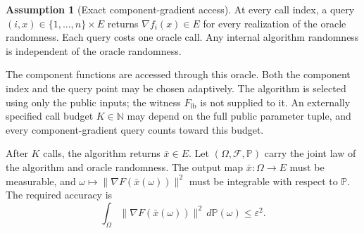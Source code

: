\documentclass[10pt]{article}
\theoremstyle{definition}
\newtheorem{assumption}{Assumption}
\begin{document}
\begin{assumption}[Exact component-gradient access]
At every call index, a query $(i,x)\in\{1,\ldots,n\}\times E$ returns $\nabla f_i(x)\in E$ for every realization of the oracle randomness. Each query costs one oracle call. Any internal algorithm randomness is independent of the oracle randomness.
\end{assumption}

The component functions are accessed through this oracle. Both the component index and the query point may be chosen adaptively. The algorithm is selected using only the public inputs; the witness $F_{\mathrm{lb}}$ is not supplied to it. An externally specified call budget $K\in\mathbb{N}$ may depend on the full public parameter tuple, and every component-gradient query counts toward this budget.

After $K$ calls, the algorithm returns $\bar{x}\in E$. Let $(\Omega,\mathcal{F},\mathbb{P})$ carry the joint law of the algorithm and oracle randomness. The output map $\bar{x}:\Omega\to E$ must be measurable, and $\omega\mapsto\|\nabla F(\bar{x}(\omega))\|^2$ must be integrable with respect to $\mathbb{P}$. The required accuracy is
\begin{equation}
\label{eq:accuracy}
\int_{\Omega}\|\nabla F(\bar{x}(\omega))\|^2\,d\mathbb{P}(\omega)
\leq\varepsilon^2.
\end{equation}
\end{document}
